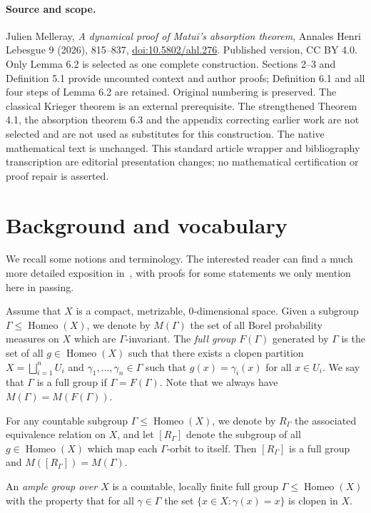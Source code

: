 \documentclass[10pt,a4paper]{article}
\theoremstyle{definition}
\DeclareMathOperator{\Homeo}{Homeo}
\newcounter{setofstep}
\newcounter{step}[setofstep]
\begin{document}
\paragraph{Source and scope.} Julien Melleray, \emph{A dynamical proof of Matui's absorption theorem}, Annales Henri Lebesgue 9 (2026), 815--837, \href{https://doi.org/10.5802/ahl.276}{doi:10.5802/ahl.276}. Published version, CC BY 4.0.
Only Lemma 6.2 is selected as one complete construction. Sections 2--3 and Definition 5.1 provide uncounted context and author proofs; Definition 6.1 and all four steps of Lemma 6.2 are retained. Original numbering is preserved.
The classical Krieger theorem is an external prerequisite. The strengthened Theorem 4.1, the absorption theorem 6.3 and the appendix correcting earlier work are not selected and are not used as substitutes for this construction.
The native mathematical text is unchanged. This standard article wrapper and bibliography transcription are editorial presentation changes; no mathematical certification or proof repair is asserted.

\section{Background and vocabulary}

We recall some notions and terminology. The interested reader can find a much more detailed exposition in~\cite{Melleray2023}, with proofs for some statements we only mention here in passing.

Assume that $X$ is a compact, metrizable, $0$-dimensional space. Given a subgroup $\Gamma \le \Homeo(X)$, we denote by $M(\Gamma)$ the set of all Borel probability measures on $X$ which are $\Gamma$-invariant. The \emph{full group} $F(\Gamma)$ generated by $\Gamma$ is the set of all $g \in \Homeo(X)$ such that there exists a clopen partition $X= \bigsqcup_{i=1}^n U_i$ and $\gamma_1,\dots,\gamma_n \in \Gamma$ such that $g(x)=\gamma_i(x)$ for all $x \in U_i$. We say that $\Gamma$ is a full group if $\Gamma=F(\Gamma)$. Note that we always have $M(\Gamma)=M(F(\Gamma))$.

For any countable subgroup $\Gamma \le \Homeo(X)$, we denote by $R_\Gamma$ the associated equivalence relation on $X$, and let $[R_\Gamma]$ denote the subgroup of all $g \in \Homeo(X)$ which map each $\Gamma$-orbit to itself. Then $[R_\Gamma]$ is a full group and $M([R_\Gamma])=M(\Gamma)$.

An \emph{ample group over $X$} is a countable, locally finite full group $\Gamma \le \Homeo(X)$ with the property that for all $\gamma \in \Gamma$ the set $\{ x \in X : \gamma(x)=x \}$ is clopen in $X$.
\end{document}
